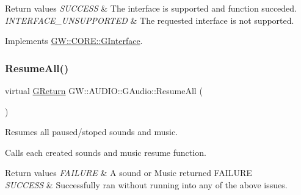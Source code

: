 \begin{DoxyRetVals}{Return values}
{\em S\+U\+C\+C\+E\+SS} & The interface is supported and function succeded. \\
\hline
{\em I\+N\+T\+E\+R\+F\+A\+C\+E\+\_\+\+U\+N\+S\+U\+P\+P\+O\+R\+T\+ED} & The requested interface is not supported. \\
\hline
\end{DoxyRetVals}


Implements \mbox{\hyperlink{class_g_w_1_1_c_o_r_e_1_1_g_interface_ad6c8324970172784964f484686d4fdad}{G\+W\+::\+C\+O\+R\+E\+::\+G\+Interface}}.

\mbox{\label{class_g_w_1_1_a_u_d_i_o_1_1_g_audio_a230edcaf3c03919d3ba86fdc16b1893f}} 
\subsubsection{\texorpdfstring{Resume\+All()}{ResumeAll()}}
{\footnotesize\ttfamily virtual \mbox{\hyperlink{namespace_g_w_a67a839e3df7ea8a5c5686613a7a3de21}{G\+Return}} G\+W\+::\+A\+U\+D\+I\+O\+::\+G\+Audio\+::\+Resume\+All (\begin{DoxyParamCaption}{ }\end{DoxyParamCaption})\hspace{0.3cm}{\ttfamily [pure virtual]}}



Resumes all paused/stoped sounds and music. 

Calls each created sound\textquotesingle{}s and music resume function. 
\begin{DoxyRetVals}{Return values}
{\em F\+A\+I\+L\+U\+RE} & A sound or Music returned F\+A\+I\+L\+U\+RE \\
\hline
{\em S\+U\+C\+C\+E\+SS} & Successfully ran without running into any of the above issues. \\
\hline
\end{DoxyRetVals}
\mbox{\label{class_g_w_1_1_a_u_d_i_o_1_1_g_audio_a51217fba0337b4e67bf43f77ba69a074}} 
